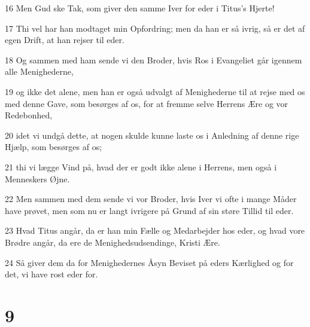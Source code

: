 \par 16 Men Gud ske Tak, som giver den samme Iver for eder i Titus's Hjerte!
\par 17 Thi vel har han modtaget min Opfordring; men da han er så ivrig, så er det af egen Drift, at han rejser til eder.
\par 18 Og sammen med ham sende vi den Broder, hvis Ros i Evangeliet går igennem alle Menighederne,
\par 19 og ikke det alene, men han er også udvalgt af Menighederne til at rejse med os med denne Gave, som besørges af os, for at fremme selve Herrens Ære og vor Redebonhed,
\par 20 idet vi undgå dette, at nogen skulde kunne laste os i Anledning af denne rige Hjælp, som besørges af os;
\par 21 thi vi lægge Vind på, hvad der er godt ikke alene i Herrens, men også i Menneskers Øjne.
\par 22 Men sammen med dem sende vi vor Broder, hvis Iver vi ofte i mange Måder have prøvet, men som nu er langt ivrigere på Grund af sin støre Tillid til eder.
\par 23 Hvad Titus angår, da er han min Fælle og Medarbejder hos eder, og hvad vore Brødre angår, da ere de Menighedsudsendinge, Kristi Ære.
\par 24 Så giver dem da for Menighedernes Åsyn Beviset på eders Kærlighed og for det, vi have rost eder for.

\chapter{9}

